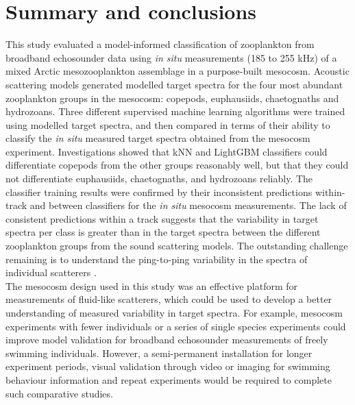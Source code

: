 \section{Summary and conclusions}
This study evaluated a model-informed classification of zooplankton from broadband echosounder data using \textit{in situ} measurements (185 to 255 kHz) of a mixed Arctic mesozooplankton assemblage in a purpose-built mesocosm. Acoustic scattering models generated modelled target spectra for the four most abundant zooplankton groups in the mesocosm: copepods, euphausiids, chaetognaths and hydrozoans. Three different supervised machine learning algorithms were trained using modelled target spectra, and then compared in terms of their ability to classify the \textit{in situ} measured target spectra obtained from the mesocosm experiment. Investigations showed that kNN and LightGBM classifiers could differentiate copepods from the other groups reasonably well, but that they could not differentiate euphausiids, chaetognaths, and hydrozoans reliably. The classifier training results were confirmed by their inconsistent predictions within-track and between classifiers for the \textit{in situ} mesocosm measurements. The lack of consistent predictions within a track suggests that the variability in target spectra per class is greater than in the target spectra between the different zooplankton groups from the sound scattering models. The outstanding challenge remaining is to understand the ping-to-ping variability in the spectra of individual scatterers \citep{Martin1996, Dunning2023}.\\
The mesocosm design used in this study was an effective platform for measurements of fluid-like scatterers, which could be used to develop a better understanding of measured variability in target spectra. For example, mesocosm experiments with fewer individuals or a series of single species experiments could improve model validation for broadband echosounder measurements of freely swimming individuals. However, a semi-permanent installation for longer experiment periods, visual validation through video or imaging for swimming behaviour information and repeat experiments would be required to complete such comparative studies. 


